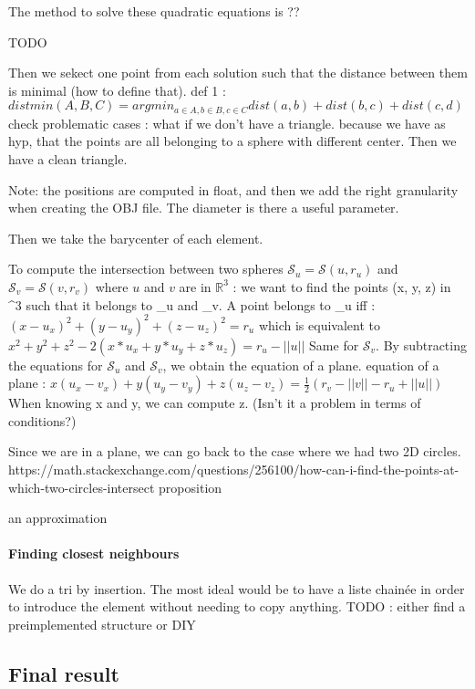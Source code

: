 \documentclass{article}
\begin{document}
The method to solve these quadratic equations is ?? 

TODO

Then we sekect one point from each solution such that the distance between them is minimal (how to define that). 
def 1 : $distmin(A, B, C) = argmin_{a \in A, b \in B, c \in C}  dist(a, b) + dist(b, c) + dist(c, d)$
check problematic cases : what if we don't have a triangle.
because we have as hyp, that the points are all belonging to a sphere with different center. Then we have a clean triangle. 


Note: the positions are computed in float, and then we add the right granularity when creating the OBJ file. The diameter is there a useful parameter. 

Then we take the barycenter of each element. 

To compute the intersection between two spheres $\mathcal{S}_{u} = \mathcal{S}(u, r_{u})$ and $\mathcal{S}_{v} = \mathcal{S}(v, r_{v})$ where $u$ and $v$ are in $\mathbb{R}^3$ :
we want to find the points (x, y, z) in ^{3} such that it belongs to _{u} and _{v}. 
A point belongs to _{u} iff : 
$ (x-u_{x})^2 + (y - u_{y})^2 + (z - u_{z})^2 = r_{u}$
which is equivalent to \\
$x^2+ y^2+z^2 - 2 (x * u_{x} + y * u_{y} + z * u_{z}) = r_{u} - ||u||$
Same for $\mathcal{S}_v$.  
By subtracting the equations for $\mathcal{S}_u$ and $\mathcal{S}_v$, we obtain the equation of a plane. 
equation of a plane : 
$x(u_{x} - v_{x}) + y (u_{y} - v_{y}) + z (u_{z} - v_{z}) = \frac{1}{2} (r_{v} - ||v|| - r_{u} + ||u||)$
When knowing x and y, we can compute z. (Isn't it a problem in terms of conditions?)

Since we are in a plane, we can go back to the case where we had two 2D circles.  
https://math.stackexchange.com/questions/256100/how-can-i-find-the-points-at-which-two-circles-intersect proposition

an approximation


\paragraph{Finding closest neighbours}
We do a tri by insertion. 
The most ideal would be to have a liste chainée in order to introduce the element without needing to copy anything. 
TODO : either find a preimplemented structure or DIY






\subsection{Final result}


\printbibliography[
heading=bibintoc,
title={Bibliography}
]
\end{document}
